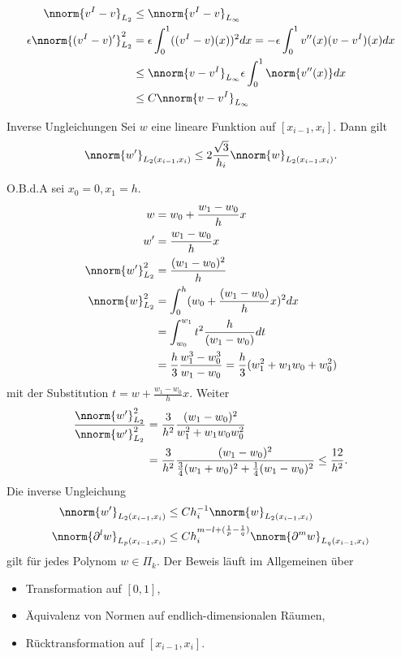 \begin{beweis}
  \begin{align*}
      \nnorm{v^I - v}_{L_{2}} &\leq \nnorm{v^I - v}_{L_{\infty}}\\
      \epsilon\nnorm{(v^I - v)'}_{L_{2}} ^{2} &= \epsilon \int_{0}^{1} ((v^{I} - v) (x))^{2} dx = - \epsilon \int_{0}^{1} v''(x)(v - v^{I}) (x) dx\\
      &\leq \nnorm{v - v^{I}}_{L_{\infty}} \epsilon \int_{0}^{1} \norm{v''(x)} dx\\
      &\leq C\nnorm{v - v^{I}}_{L_{\infty}} 
  \end{align*}
\end{beweis}
\begin{lemma*} Inverse Ungleichungen
  Sei  $w$ eine lineare Funktion auf $[x_{i-1}, x_{i}]$. Dann gilt
  \begin{align*}
    \nnorm{w'}_{L_{2}(x_{i-1}, x_{i})} \leq 2 \frac{\sqrt 3}{h_{i}} \nnorm{w}_{L_{2}(x_{i-1}, x_{i})}. 
  \end{align*}
\end{lemma*}
\begin{beweis}O.B.d.A sei $x_{0} = 0, x_{1} = h$. 
  \begin{align*} 
    w &= w_{0} + \frac{w_{1} - w_{0}} h x\\
    w' &=\frac{w_{1} - w_{0}} h x\\
    \nnorm{w'}_{L_{2}}^{2} &=\frac{(w_{1} - w_{0})^{2}} h \\
    \nnorm{w}_{L_{2}}^{2} &= \int_{0}^{h} (w_{0} + \frac{(w_{1} - w_{0})} hx)^{2} dx \\
    &= \int_{w_{0}}^{w_{1}} t^{2} \frac{ h }{(w_{1} - w_{0})} dt \\
    &= \frac h 3 \frac{w_{1}^{3} - w_{0}^{3}}{w_{1} - w_{0}} = \frac h 3 (w_{1}^{2} + w_{1}w_{0} + w_{0}^{2})
  \end{align*}
mit der Substitution $t = w + \frac {w_{1} - w_{0}} h x$. Weiter
\begin{align*}
  \frac {\nnorm {w'}_{L_{2}}^{2}}{\nnorm {w'}_{L_{2}}^{2}} &= \frac 3 {h^{2}} \frac{(w_{1} - w_{0})^{2}} {w_{1}^{2} + w_{1}w_{0} w_{0}^{2}} \\
  &= \frac 3 {h^{2}} \frac {(w_{1} - w_{0})^{2}}{\frac 34 (w_{1} + w_{0})^{2} + \frac 14 (w_{1} - w_{0})^{2}} \leq \frac {12}{h^{2}}. 
\end{align*}
Die inverse Ungleichung
\begin{align*}
      \nnorm{w'}_{L_{2}(x_{i-1}, x_{i})} &\leq  C h_{i}^{-1} \nnorm{w}_{L_{2}(x_{i-1}, x_{i})}\\
      \nnorm{\partial^{l} w}_{L_{p}(x_{i-1}, x_{i})} &\leq  C h_{i}^{m - l + (\frac 1 p - \frac 1 q)} \nnorm{\partial^{m} w}_{L_{q}(x_{i-1}, x_{i})}\\
\end{align*}
gilt für jedes Polynom $w \in \Pi_{k}$. Der Beweis läuft im Allgemeinen über
\begin{itemize}
\item Transformation auf $[0, 1]$, 
\item Äquivalenz von Normen auf endlich-dimensionalen Räumen, 
\item Rücktransformation auf $[x_{i-1}, x_{i}]$. 
\end{itemize}
\end{beweis}
